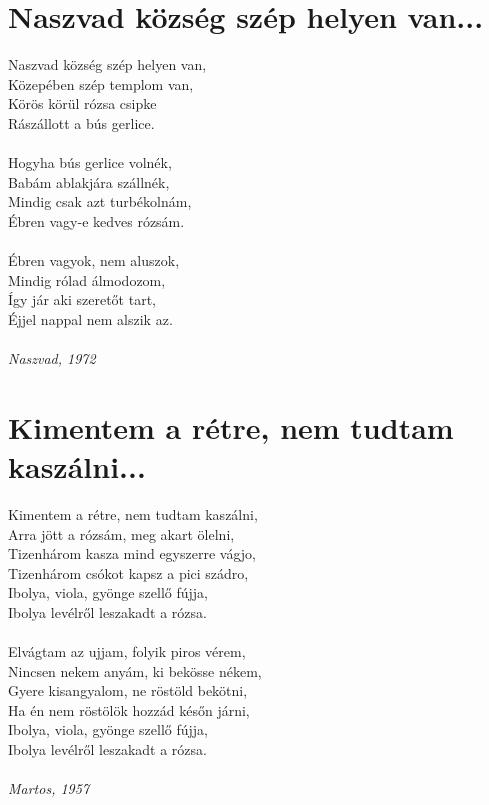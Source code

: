 \section{Naszvad község szép helyen van...}
Naszvad község szép helyen van,\\
Közepében szép templom van,\\
Körös körül rózsa csipke\\
Rászállott a bús gerlice.\\\\
Hogyha bús gerlice volnék,\\
Babám ablakjára szállnék,\\
Mindig csak azt turbékolnám,\\
Ébren vagy-e kedves rózsám.\\\\
Ébren vagyok, nem aluszok,\\
Mindig rólad álmodozom,\\
Így jár aki szeretőt tart,\\
Éjjel nappal nem alszik az.\\\\
\textit{Naszvad, 1972}

\section{Kimentem a rétre, nem tudtam kaszálni...}
Kimentem a rétre, nem tudtam kaszálni,\\
Arra jött a rózsám, meg akart ölelni,\\
Tizenhárom kasza mind egyszerre vágjo,\\
Tizenhárom csókot kapsz a pici szádro,\\
Ibolya, viola, gyönge szellő fújja,\\
Ibolya levélről leszakadt a rózsa.\\\\
Elvágtam az ujjam, folyik piros vérem,\\
Nincsen nekem anyám, ki bekösse nékem,\\
Gyere kisangyalom, ne röstöld bekötni,\\
Ha én nem röstölök hozzád későn járni,\\
Ibolya, viola, gyönge szellő fújja,\\
Ibolya levélről leszakadt a rózsa.\\\\
\textit{Martos, 1957}

